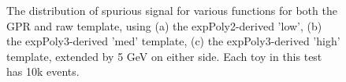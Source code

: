 \begin{figure} 
\begin{center}

\caption{The distribution of spurious signal for various functions for both the GPR and raw template, using (a) the expPoly2-derived 'low', (b) the expPoly3-derived 'med' template, (c) the expPoly3-derived 'high' template, extended by 5 GeV on either side. Each toy in this test has 10k events.}
\label{fig:padded_lowpt_10k_noSig}
\end{center}
\end{figure}

